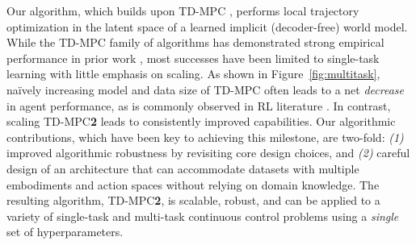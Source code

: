 \documentclass{article}
\begin{document}
Our algorithm, which builds upon TD-MPC \citep{Hansen2022tdmpc}, performs local trajectory optimization in the latent space of a learned implicit (decoder-free) world model. While the TD-MPC family of algorithms has demonstrated strong empirical performance in prior work \citep{Hansen2022tdmpc, hansen2022modem, yuan2022euclid, yang2023movie, Feng2023Finetuning, chitnis2023iql, zhu2023repo, lancaster2023modemv2}, most successes have been limited to single-task learning with little emphasis on scaling. As shown in Figure~\ref{fig:multitask}, naïvely increasing model and data size of TD-MPC often leads to a net \emph{decrease} in agent performance, as is commonly observed in RL literature \citep{kumar2022offline}. In contrast, scaling TD-MPC\textbf{2} leads to consistently improved capabilities. Our algorithmic contributions, which have been key to achieving this milestone, are two-fold: \emph{(1)} improved algorithmic robustness by revisiting core design choices, and \emph{(2)} careful design of an architecture that can accommodate datasets with multiple embodiments and action spaces without relying on domain knowledge. The resulting algorithm, TD-MPC\textbf{2}, is scalable, robust, and can be applied to a variety of single-task and multi-task continuous control problems using a \emph{single} set of hyperparameters.
\end{document}
